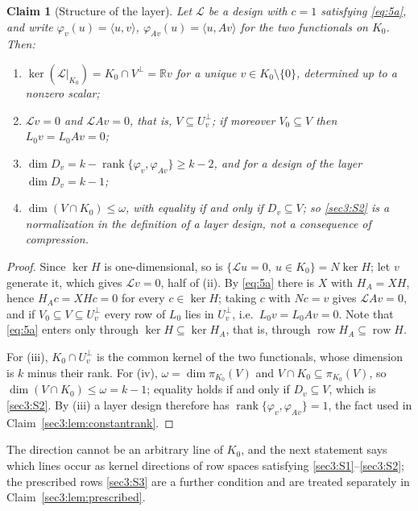 \documentclass[journal]{IEEEtran}
\theoremstyle{plainn}
\newtheorem{claim}{Claim}
\theoremstyle{remark}
\newcommand{\row}{\operatorname{row}}
\newcommand{\rank}{\operatorname{rank}}
\begin{document}
\begin{claim}[Structure of the layer]
\label{sec3:lem:direction}
\label{sec3:lem:Dv}
\label{sec3:rem:omega}
Let $\mathcal{L}$ be a design with $c=1$ satisfying \eqref{eq:5a}, and write
$\varphi_v(u)=\langle u,v\rangle$, $\varphi_{Av}(u)=\langle u,Av\rangle$ for the two functionals on
$K_0$. Then:
\begin{enumerate}[label=(\roman*),leftmargin=*,itemsep=1pt,topsep=2pt]
\item $\ker(\mathcal{L}|_{K_0})=K_0\cap V^\perp=\mathbb{R} v$ for a unique
$v\in K_0\setminus\{0\}$, determined up to a nonzero scalar;
\item $\mathcal{L}v=0$ and $\mathcal{L}Av=0$, that is, $V\subseteq U_v^\perp$; if moreover
$V_0\subseteq V$ then $L_0v=L_0Av=0$;
\item $\dim D_v=k-\rank\{\varphi_v,\varphi_{Av}\}\ge k-2$, and for a design of the layer
$\dim D_v=k-1$;
\item $\dim(V\cap K_0)\le\omega$, with equality if and only if $D_v\subseteq V$; so \ref{sec3:S2} is a
normalization in the definition of a layer design, not a consequence of compression.
\end{enumerate}
\end{claim}
\begin{proof}
Since $\ker H$ is one-dimensional, so is $\{\mathcal{L}u=0,\ u\in K_0\}=N\ker H$; let $v$ generate it,
which gives $\mathcal{L}v=0$, half of (ii). By \eqref{eq:5a} there is $X$ with $H_A=XH$, hence
$H_Ac=XHc=0$ for every $c\in\ker H$; taking $c$ with $Nc=v$ gives $\mathcal{L}Av=0$, and if
$V_0\subseteq V\subseteq U_v^\perp$ every row of $L_0$ lies in $U_v^\perp$, i.e.\ $L_0v=L_0Av=0$.
Note that \eqref{eq:5a} enters only through $\ker H\subseteq\ker H_A$, that is, through
$\row H_A\subseteq\row H$.

For (iii), $K_0\cap U_v^\perp$ is the common kernel of the two functionals, whose dimension is $k$
minus their rank. For (iv), $\omega=\dim\pi_{K_0}(V)$ and $V\cap K_0\subseteq\pi_{K_0}(V)$, so
$\dim(V\cap K_0)\le\omega=k-1$; equality holds if and only if $D_v\subseteq V$, which is
\ref{sec3:S2}. By (iii) a layer design therefore has $\rank\{\varphi_v,\varphi_{Av}\}=1$, the fact used in Claim~\ref{sec3:lem:constantrank}.
\end{proof}


The direction cannot be an arbitrary line of $K_0$, and the next statement says which lines occur as
kernel directions of row spaces satisfying \ref{sec3:S1}--\ref{sec3:S2}; the prescribed rows
\ref{sec3:S3} are a further condition and are treated separately in Claim~\ref{sec3:lem:prescribed}.
\end{document}

